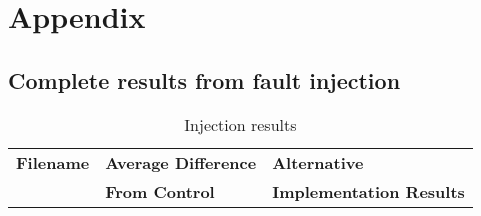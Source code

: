 \section{Appendix}

\subsection{Complete results from fault injection}\label{appendix:complete_injection_results}

\begin{longtable}{lll}
\caption{Injection results}
\label{lst:injection_results}\\
{\bf Filename} & {\bf Average Difference} & {\bf Alternative } \\
             & {\bf From Control }      & {\bf Implementation Results}\\
 

\end{longtable}
